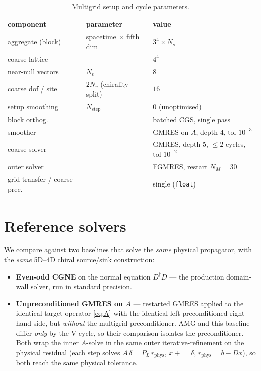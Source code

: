 \documentclass[12pt,a4paper]{article}
\newcommand{\Ddw}{D}
\newcommand{\Aop}{A}
\newcommand{\PL}{P_{L}}
\newcommand{\dg}{^{\dagger}}
\begin{document}
\begin{table}[h]
\centering
\begin{tabular}{lll}
\toprule
component & parameter & value \\
\midrule
aggregate (block) & spacetime $\times$ fifth dim & $3^4 \times N_s$ \\
coarse lattice    &                              & $4^4$ \\
near-null vectors & $N_v$                        & $8$ \\
coarse dof / site & $2N_v$ (chirality split)     & $16$ \\
setup smoothing   & $N_{\mathrm{step}}$          & $0$ (unoptimised) \\
block orthog.     &                              & batched CGS, single pass \\
smoother          &                              & GMRES-on-$\Aop$, depth $4$, tol $10^{-3}$ \\
coarse solver     &                              & GMRES, depth $5$, $\le2$ cycles, tol $10^{-2}$ \\
outer solver      &                              & FGMRES, restart $N_M=30$ \\
grid transfer / coarse prec. &                   & single (\texttt{float}) \\
\bottomrule
\end{tabular}
\caption{Multigrid setup and cycle parameters.}
\label{tab:mg}
\end{table}

\section{Reference solvers}
\label{sec:reference}
We compare against two baselines that solve the \emph{same} physical propagator,
with the \emph{same} 5D--4D chiral source/sink construction:
\begin{itemize}
\item \textbf{Even-odd CGNE} on the normal equation $\Ddw\dg\Ddw$ --- the
production domain-wall solver, run in standard precision.
\item \textbf{Unpreconditioned GMRES on $\Aop$} --- restarted GMRES applied to the
identical target operator \eqref{eq:A} with the identical left-preconditioned
right-hand side, but \emph{without} the multigrid preconditioner. AMG and this
baseline differ \emph{only} by the V-cycle, so their comparison isolates the
preconditioner. Both wrap the inner $\Aop$-solve in the same outer
iterative-refinement on the physical residual (each step solves
$\Aop\,\delta=\PL\,r_{\mathrm{phys}}$, $x\!+\!=\!\delta$,
$r_{\mathrm{phys}}=b-\Ddw x$), so both reach the same physical tolerance.
\end{itemize}
\end{document}
